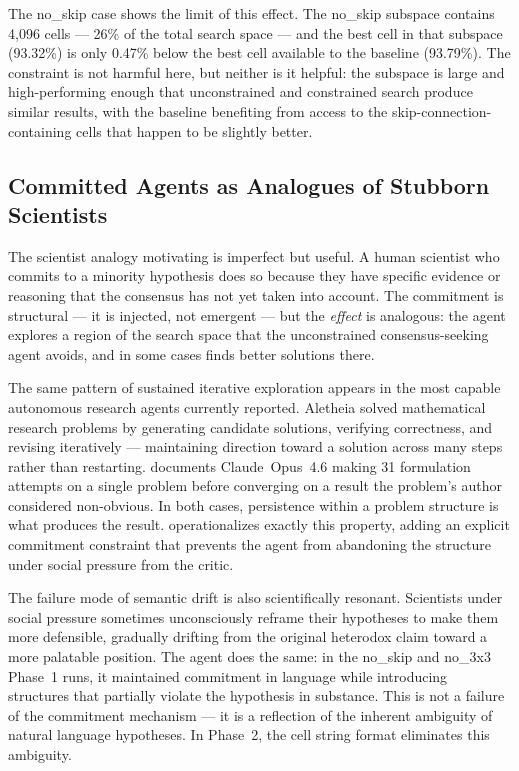 The no\_skip case shows the limit of this effect. The no\_skip subspace contains
4,096 cells --- 26\% of the total search space --- and the best cell in that
subspace (93.32\%) is only 0.47\% below the best cell available to the baseline
(93.79\%). The constraint is not harmful here, but neither is it helpful: the
subspace is large and high-performing enough that unconstrained and constrained
search produce similar results, with the baseline benefiting from access to the
skip-connection-containing cells that happen to be slightly better.

\subsection{Committed Agents as Analogues of Stubborn Scientists}

The scientist analogy motivating \haas{} is imperfect but useful. A human
scientist who commits to a minority hypothesis does so because they have
specific evidence or reasoning that the consensus has not yet taken into account.
The \haas{} commitment is structural --- it is injected, not emergent --- but
the \emph{effect} is analogous: the agent explores a region of the search space
that the unconstrained consensus-seeking agent avoids, and in some cases finds
better solutions there.

The same pattern of sustained iterative exploration appears in the most capable
autonomous research agents currently reported. Aletheia \citep{feng2026aletheia}
solved mathematical research problems by generating candidate solutions,
verifying correctness, and revising iteratively --- maintaining direction toward
a solution across many steps rather than restarting. \citet{knuth2026claude}
documents Claude~Opus~4.6 making 31 formulation attempts on a single problem
before converging on a result the problem's author considered non-obvious. In
both cases, persistence within a problem structure is what produces the result.
\haas{} operationalizes exactly this property, adding an explicit commitment
constraint that prevents the agent from abandoning the structure under social
pressure from the critic.

The failure mode of semantic drift is also scientifically resonant. Scientists
under social pressure sometimes unconsciously reframe their hypotheses to make
them more defensible, gradually drifting from the original heterodox claim toward
a more palatable position. The \haas{} agent does the same: in the no\_skip and
no\_3x3 Phase~1 runs, it maintained commitment in language while introducing
structures that partially violate the hypothesis in substance. This is not a
failure of the commitment mechanism --- it is a reflection of the inherent
ambiguity of natural language hypotheses. In Phase~2, the cell string format
eliminates this ambiguity.

